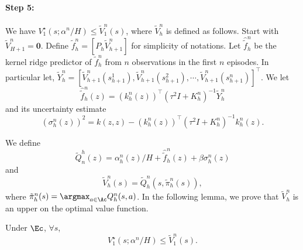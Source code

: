 \vspace{5em}
\paragraph{Step 5:} We have $V^{\star}_1(s; \alpha^n/H)\le \tilde{V}^n_1(s)$, where $\tilde{V}^n_h$ is defined as follows. Start with $\tilde{V}^n_{H+1}=\bm{0}$. Define $\tilde{f}_h^n=[P_h\tilde{V}^{n}_{h+1}]$ for simplicity of notations. Let $\hat{\tilde{f}}_h^n$ be the kernel ridge predictor of $\tilde{f}_h^n$ from $n$ observations in the first $n$ episodes. In particular let, $\tilde{Y}^{n}_h=[\tilde{V}^n_{h+1}(s^1_{h+1}), \tilde{V}^n_{h+1}(s^2_{h+1}), \cdots, \tilde{V}^n_{h+1}(s^n_{h+1})]^{\top}$. We let
\begin{equation*}
    \hat{\tilde{f}}_h^n(z) = (k^n_h(z))^{\top}(\tau^2I+K^n_h)^{-1}\tilde{Y}^{n}_h
\end{equation*}
and its uncertainty estimate
\begin{equation*}
    (\sigma_h^n(z))^2 = k(z,z)- (k^n_h(z))^{\top}(\tau^2I+K^n_h)^{-1}k^n_h(z).
\end{equation*}

We define 
\begin{equation*}
    \tilde{Q}^h_n(z)= \alpha^n_h(z)/H +  \hat{\tilde{f}}_h^n(z) + \beta\sigma_h^n(z)
\end{equation*}
and 
\begin{equation*}
    \tilde{V}^n_h(s)= \tilde{Q}^n_h(s,\tilde{\pi}^n_h(s)),
\end{equation*}
where $\tilde{\pi}^n_h(s)=\argmax_{a\in\Ac}Q^n_h(s,a)$.
In the following lemma, we prove that $\tilde{V}^n_h$ is an upper on the optimal value function.

\begin{lemma}\label{lem:VstarVn}
    Under $\Ec$, $\forall s$, 
    \begin{equation*}
        V^{\star}_1(s; \alpha^n/H)\le \tilde{V}^n_1(s).
    \end{equation*}
\end{lemma}

